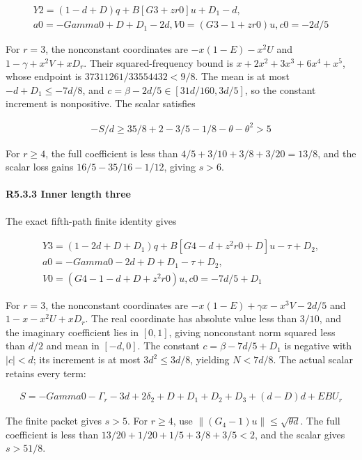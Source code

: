 \[
\begin{gathered}
Y2=(1-d+D)q+B[G3+zr0]u+D_1-d,\\
a0=-Gamma0+D+D_1-2d,V0=(G3-1+zr0)u,c0=-2d/5
\end{gathered}
\]

For \(r=3\), the nonconstant coordinates are \(-x(1-E)-x^2U\) and \(1-\gamma+x^2V+xD_r\). Their squared-frequency bound is \(x+2x^2+3x^3+6x^4+x^5\), whose endpoint is \(37311261/33554432<9/8\). The mean is at most \(-d+D_1\le-7d/8\), and \(c=\beta-2d/5\in[31d/160,\allowbreak \allowbreak  3d/5]\), so the constant increment is nonpositive. The scalar satisfies

\[
\begin{gathered}
-S/d\ge 35/8+2-3/5-1/8-\theta-\theta^2>5
\end{gathered}
\]

For \(r\ge4\), the full coefficient is less than \(4/5+3/10+3/8+3/20=13/8\), and the scalar loss gains \(16/5-35/16-1/12\), giving \(s>6\).

\paragraph{R5.3.3 Inner length three}\label{part:R5.3.3}

The exact fifth-path finite identity gives

\[
\begin{gathered}
Y3=(1-2d+D+D_1)q+B[G4-d+z^2r0+D]u-\tau+D_2,\\
a0=-Gamma0-2d+D+D_1-\tau+D_2,\\
V0=(G4-1-d+D+z^2r0)u,c0=-7d/5+D_1
\end{gathered}
\]

For \(r=3\), the nonconstant coordinates are \(-x(1-E)+\gamma x-x^3V-2d/5\) and \(1-x-x^2U+xD_r\). The real coordinate has absolute value less than \(3/10\), and the imaginary coefficient lies in \([0,\allowbreak \allowbreak  1]\), giving nonconstant norm squared less than \(d/2\) and mean in \([-d,\allowbreak \allowbreak  0]\). The constant \(c=\beta-7d/5+D_1\) is negative with \(|c|<d\); its increment is at most \(3d^2\le3d/8\), yielding \(N<7d/8\). The actual scalar retains every term:

\[
\begin{gathered}
S=-Gamma0-\Gamma_r-3d+2\delta_2+D+D_1+D_2+D_3+(d-D)d+EBU_r
\end{gathered}
\]

The finite packet gives \(s>5\). For \(r\ge4\), use \(\|(G_4-1)u\|\le\sqrt{\theta d}\). The full coefficient is less than \(13/20+1/20+1/5+3/8+3/5<2\), and the scalar gives \(s>51/8\).

